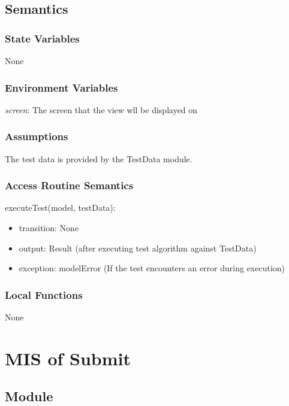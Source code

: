 \documentclass[12pt, titlepage]{article}
\begin{document}
\subsection{Semantics}

\subsubsection{State Variables}

None

\subsubsection{Environment Variables}

\textit{screen}: The screen that the view wll be displayed on

\subsubsection{Assumptions}

The test data is provided by the TestData module.

\subsubsection{Access Routine Semantics}

\noindent executeTest(model, testData):
\begin{itemize}
\item transition: None
\item output: Result  (after executing test algorithm against TestData)
\item exception: modelError (If the test encounters an error during execution)
\end{itemize}

\subsubsection{Local Functions}

None

\newpage

\section{MIS of Submit} \label{SubmitModule}

\subsection{Module}
\end{document}
